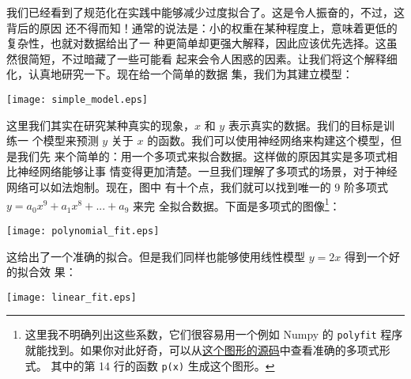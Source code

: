 %
%
% 

我们已经看到了规范化在实践中能够减少过度拟合了。这是令人振奋的，不过，这背后的原因
还不得而知！通常的说法是：小的权重在某种程度上，意味着更低的复杂性，也就对数据给出了一
种更简单却更强大解释，因此应该优先选择。这虽然很简短，不过暗藏了一些可能看
起来会令人困惑的因素。让我们将这个解释细化，认真地研究一下。现在给一个简单的数据
集，我们为其建立模型：
\begin{center}
	\texttt{[image: simple\_model.eps]}
\end{center}
	
这里我们其实在研究某种真实的现象，$x$ 和 $y$ 表示真实的数据。我们的目标是训练一
个模型来预测 $y$ 关于 $x$ 的函数。我们可以使用神经网络来构建这个模型，但是我们先
来个简单的：用一个多项式来拟合数据。这样做的原因其实是多项式相比神经网络能够让事
情变得更加清楚。一旦我们理解了多项式的场景，对于神经网络可以如法炮制。现在，图中
有十个点，我们就可以找到唯一的 $9$ 阶多项式 $y=a_0x^9 + a_1x^8 + ... + a_9$ 来完
全拟合数据。下面是多项式的图像\footnote{这里我不明确列出这些系数，它们很容易用一个例如 Numpy 
的 \lstinline!polyfit! 程序就能找到。如果你对此好奇，可以从\href{http://neuralnetworksanddeeplearning.com/js/polynomial_model.js}{这个图形的源码}中查看准确的多项式形式。
其中的第 14 行的函数 \lstinline!p(x)! 生成这个图形。}：
\begin{center}
	\texttt{[image: polynomial\_fit.eps]}
\end{center}

这给出了一个准确的拟合。但是我们同样也能够使用线性模型 $y=2x$ 得到一个好的拟合效
果：
\begin{center}
	\texttt{[image: linear\_fit.eps]}
\end{center}

